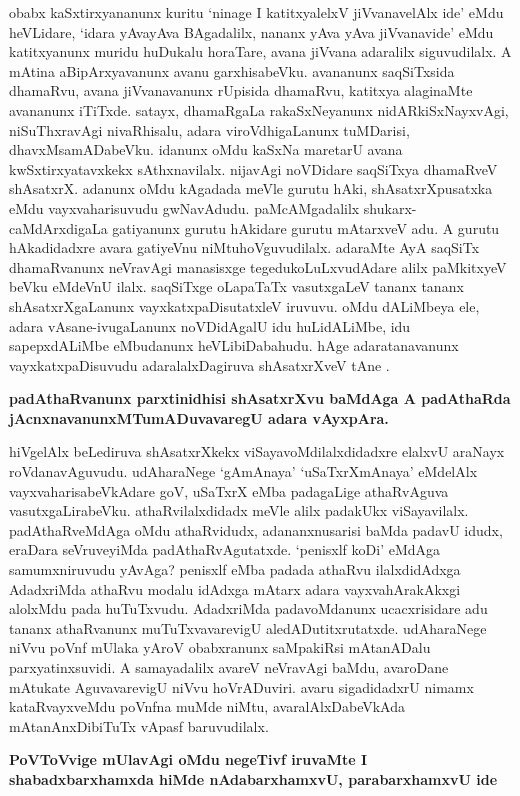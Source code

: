 obabx kaSxtirxyananunx kuritu `ninage I katitxyalelxV jiVvanavelAlx ide' eMdu heVLidare, `idara yAvayAva BAgadalilx, nananx yAva yAva jiVvanavide' eMdu katitxyanunx muridu huDukalu horaTare, avana jiVvana adaralilx siguvudilalx. A mAtina aBipArxyavanunx avanu garxhisabeVku. avananunx saqSiTxsida dhamaRvu, avana jiVvanavanunx rUpisida dhamaRvu, katitxya alaginaMte avananunx iTiTxde. satayx, dhamaRgaLa rakaSxNeyanunx nidARkiSxNayxvAgi, niSuThxravAgi nivaRhisalu, adara viroVdhigaLanunx tuMDarisi, dhavxMsamADabeVku. idanunx oMdu kaSxNa maretarU avana kwSxtirxyatavxkekx sAthxnavilalx. nijavAgi noVDidare saqSiTxya dhamaRveV shAsatxrX. adanunx oMdu kAgadada meVle gurutu hAki, shAsatxrXpusatxka eMdu vayxvaharisuvudu gwNavAdudu. paMcAMgadalilx shukarx-caMdArxdigaLa gatiyanunx gurutu hAkidare gurutu mAtarxveV adu. A gurutu hAkadidadxre avara gatiyeVnu niMtuhoVguvudilalx. adaraMte AyA saqSiTx dhamaRvanunx neVravAgi manasisxge tegedukoLuLxvudAdare alilx paMkitxyeV beVku eMdeVnU ilalx. saqSiTxge oLapaTaTx vasutxgaLeV tananx tananx shAsatxrXgaLanunx vayxkatxpaDisutatxleV iruvuvu. oMdu dALiMbeya ele, adara vAsane-ivugaLanunx noVDidAgalU idu huLidALiMbe, idu sapepxdALiMbe eMbudanunx heVLibiDabahudu. hAge adaratanavanunx vayxkatxpaDisuvudu adaralalxDagiruva shAsatxrXveV tAne
.

\noindent
{\bf\large{padAthaRvanunx parxtinidhisi shAsatxrXvu baMdAga A padAthaRda jAcnxnavanunxMTumADuvavaregU adara vAyxpAra.}}\label{page198}                               

hiVgelAlx beLediruva shAsatxrXkekx viSayavoMdilalxdidadxre elalxvU araNayx roVdanavAguvudu. udAharaNege `gAmAnaya' `uSaTxrXmAnaya' eMdelAlx vayxvaharisabeVkAdare goV, uSaTxrX eMba padagaLige athaRvAguva vasutxgaLirabeVku. athaRvilalxdidadx meVle alilx padakUkx viSayavilalx. padAthaRveMdAga oMdu athaRvidudx, adananxnusarisi baMda padavU idudx, eraDara seVruveyiMda padAthaRvAgutatxde. `penisxlf koDi' eMdAga samumxniruvudu yAvAga? penisxlf eMba padada athaRvu ilalxdidAdxga AdadxriMda athaRvu modalu idAdxga mAtarx adara vayxvahArakAkxgi alolxMdu pada huTuTxvudu. AdadxriMda padavoMdanunx ucacxrisidare adu tananx athaRvanunx muTuTxvavarevigU aledADutitxrutatxde. udAharaNege niVvu poVnf mUlaka yAroV obabxranunx saMpakiRsi mAtanADalu parxyatinxsuvidi. A samayadalilx avareV neVravAgi baMdu, avaroDane mAtukate AguvavarevigU niVvu hoVrADuviri. avaru sigadidadxrU nimamx kataRvayxveMdu poVnfna muMde niMtu, avaralAlxDabeVkAda mAtanAnxDibiTuTx vApasf baruvudilalx.

\noindent
{\bf\large{PoVToVvige mUlavAgi oMdu negeTivf iruvaMte I shabadxbarxhamxda hiMde nAdabarxhamxvU, parabarxhamxvU ide}}\label{page199}

